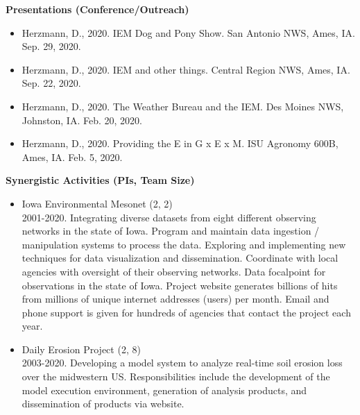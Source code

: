 \normalsize \sf
\normalsize \bf Presentations (Conference/Outreach)
\normalsize \sf
\begin{itemize}
    \item Herzmann, D., 2020. IEM Dog and Pony Show. San Antonio NWS, Ames, IA. Sep. 29, 2020.
    \item Herzmann, D., 2020. IEM and other things. Central Region NWS, Ames, IA. Sep. 22, 2020.
    \item Herzmann, D., 2020. The Weather Bureau and the IEM. Des Moines NWS, Johnston, IA. Feb. 20, 2020.
    \item Herzmann, D., 2020. Providing the E in G x E x M. ISU Agronomy 600B, Ames, IA. Feb. 5, 2020.
\end{itemize}

\vspace*{0.25in}
\Large \bf Synergistic Activities (PIs, Team Size)
\normalsize \sf
\begin{itemize}
\item Iowa Environmental Mesonet (2, 2)\\
2001-2020. Integrating diverse datasets from eight
different observing networks in the state of Iowa.  Program and maintain data
ingestion / manipulation systems to process the data. Exploring and implementing 
new techniques for data visualization and dissemination.  Coordinate with local
agencies with oversight of their observing networks.  Data focalpoint for 
observations in the state of Iowa. Project website generates billions of hits 
from millions of unique internet addresses (users) per month.  Email and 
phone support is given for hundreds of agencies that contact the project each
year.
\item Daily Erosion Project (2, 8)\\
2003-2020. Developing a model system to analyze real-time soil erosion loss over the 
midwestern US.  Responsibilities include the development of the model execution
environment, generation of analysis products, and dissemination of products 
via website.
\end{itemize}
\vspace*{0.25in}
%

%

\pagebreak

